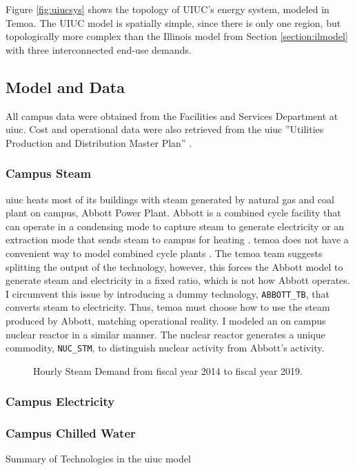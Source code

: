 Figure \ref{fig:uiucsys} shows the topology of UIUC’s energy system, modeled in Temoa.
The UIUC model is spatially simple, since there is only one region, but topologically
more complex than the Illinois model from Section \ref{section:ilmodel} with
three interconnected end-use demands.

\subsection{Model and Data}
All campus data were obtained from the Facilities and Services Department at \gls{uiuc}.
Cost and operational data were also retrieved from the \gls{uiuc} ''Utilities
Production and Distribution Master Plan'' \cite{affiliated_engineers_inc_utilities_2015}.

\subsubsection{Campus Steam}
\gls{uiuc} heats most of its buildings with steam generated by natural gas and
coal plant on campus, Abbott Power Plant. Abbott is a combined cycle facility that
can operate in a condensing mode to capture steam to generate electricity or an
extraction mode that sends steam to campus for heating
\cite{affiliated_engineers_inc_utilities_2015}. \gls{temoa} does not have a
convenient way to model combined cycle plants \cite{decarolis_temoa_2010}. The
\gls{temoa} team suggests splitting the output of the technology, however, this
forces the Abbott model to generate steam and electricity in a fixed ratio, which
is not how Abbott operates. I circumvent this issue by introducing a dummy technology,
\texttt{ABBOTT\_TB}, that converts steam to electricity. Thus, \gls{temoa} must
choose how to use the steam produced by Abbott, matching operational reality.
I modeled an on campus nuclear reactor in a similar manner. The nuclear reactor
generates a unique commodity, \texttt{NUC\_STM}, to distinguish nuclear activity
from Abbott's activity.

\begin{figure}[H]
  \centering
  \resizebox{0.8\columnwidth}{!}{}
  \caption{Hourly Steam Demand from fiscal year 2014 to fiscal year 2019.}
  \label{fig:historical-steam}
\end{figure}

\subsubsection{Campus Electricity}

\subsubsection{Campus Chilled Water}

\begin{table}[H]
  \centering
  \caption{Summary of Technologies in the \gls{uiuc} model}
  \label{tab:uiuc-tech}
  \resizebox{\textwidth}{!}{
  
  } %
\end{table}
